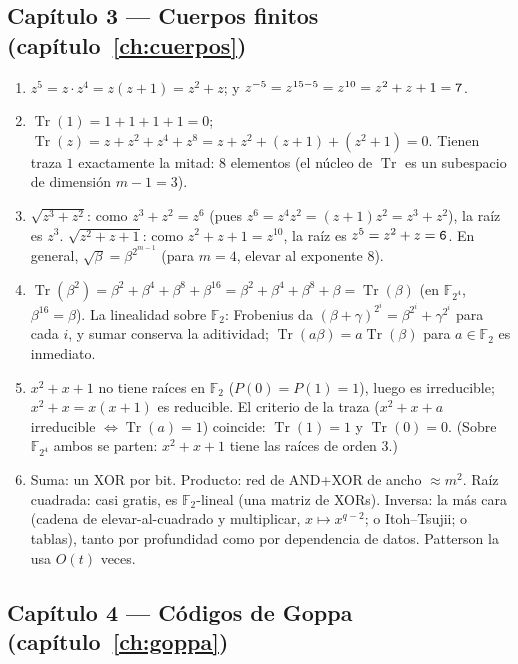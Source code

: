 \documentclass[11pt,a4paper,oneside]{report}
\newcommand{\F}{\mathbb{F}}
\newcommand{\Ftwo}{\F_2}
\newcommand{\FF}[1]{\F_{2^{#1}}}
\DeclareMathOperator{\Tr}{Tr}
\newcommand{\hx}[1]{\text{\texttt{#1}}}
\begin{document}
\subsection*{Capítulo 3 --- Cuerpos finitos
(capítulo~\ref{ch:cuerpos})}

\begin{enumerate}[leftmargin=1.9em,itemsep=4pt]
  \item $z^5=z\cdot z^4=z(z+1)=z^2+z$; y
        $z^{-5}=z^{15-5}=z^{10}=z^2+z+1=\hx7$.
  \item $\Tr(1)=1+1+1+1=0$; $\Tr(z)=z+z^2+z^4+z^8
        =z+z^2+(z+1)+(z^2+1)=0$. Tienen traza $1$ exactamente la
        mitad: $8$ elementos (el núcleo de $\Tr$ es un subespacio
        de dimensión $m-1=3$).
  \item $\sqrt{z^3+z^2}$: como $z^3+z^2=z^6$ (pues
        $z^6=z^4z^2=(z+1)z^2=z^3+z^2$), la raíz es $z^3$.
        $\sqrt{z^2+z+1}$: como $z^2+z+1=z^{10}$, la raíz es
        $z^5=z^2+z=\hx6$. En general, $\sqrt{\beta}=\beta^{2^{m-1}}$
        (para $m=4$, elevar al exponente $8$).
  \item $\Tr(\beta^2)=\beta^2+\beta^4+\beta^8+\beta^{16}
        =\beta^2+\beta^4+\beta^8+\beta=\Tr(\beta)$ (en $\FF4$,
        $\beta^{16}=\beta$). La linealidad sobre $\Ftwo$: Frobenius da
        $(\beta+\gamma)^{2^i}=\beta^{2^i}+\gamma^{2^i}$ para cada
        $i$, y sumar conserva la aditividad; $\Tr(a\beta)=a\Tr(\beta)$
        para $a\in\Ftwo$ es inmediato.
  \item $x^2+x+1$ no tiene raíces en $\Ftwo$ ($P(0)=P(1)=1$), luego
        es irreducible; $x^2+x=x(x+1)$ es reducible. El criterio de la
        traza ($x^2+x+a$ irreducible $\iff\Tr(a)=1$) coincide:
        $\Tr(1)=1$ y $\Tr(0)=0$. (Sobre $\FF4$ ambos se parten:
        $x^2+x+1$ tiene las raíces de orden $3$.)
  \item Suma: un XOR por bit. Producto: red de AND+XOR de ancho
        $\approx m^2$. Raíz cuadrada: casi gratis, es $\Ftwo$-lineal
        (una matriz de XORs). Inversa: la más cara (cadena de
        elevar-al-cuadrado y multiplicar, $x\mapsto x^{q-2}$; o
        Itoh--Tsujii; o tablas), tanto por profundidad como por
        dependencia de datos. Patterson la usa $O(t)$ veces.
\end{enumerate}

\subsection*{Capítulo 4 --- Códigos de Goppa
(capítulo~\ref{ch:goppa})}
\end{document}
